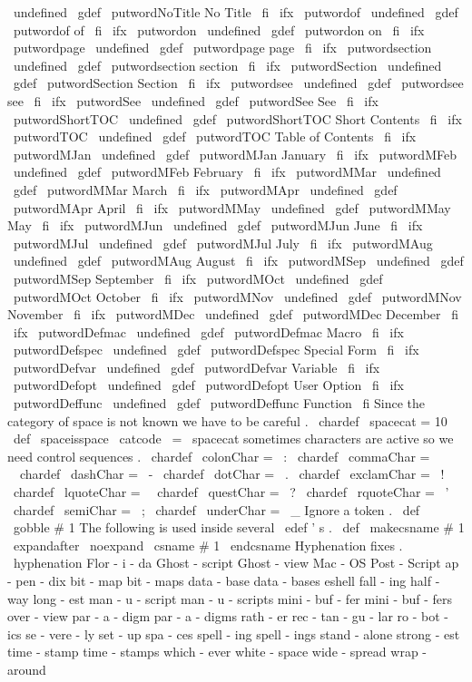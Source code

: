 \
undefined
\
gdef
\
putwordNoTitle
{
No
Title
}
\
fi
\
ifx
\
putwordof
\
undefined
\
gdef
\
putwordof
{
of
}
\
fi
\
ifx
\
putwordon
\
undefined
\
gdef
\
putwordon
{
on
}
\
fi
\
ifx
\
putwordpage
\
undefined
\
gdef
\
putwordpage
{
page
}
\
fi
\
ifx
\
putwordsection
\
undefined
\
gdef
\
putwordsection
{
section
}
\
fi
\
ifx
\
putwordSection
\
undefined
\
gdef
\
putwordSection
{
Section
}
\
fi
\
ifx
\
putwordsee
\
undefined
\
gdef
\
putwordsee
{
see
}
\
fi
\
ifx
\
putwordSee
\
undefined
\
gdef
\
putwordSee
{
See
}
\
fi
\
ifx
\
putwordShortTOC
\
undefined
\
gdef
\
putwordShortTOC
{
Short
Contents
}
\
fi
\
ifx
\
putwordTOC
\
undefined
\
gdef
\
putwordTOC
{
Table
of
Contents
}
\
fi
%
\
ifx
\
putwordMJan
\
undefined
\
gdef
\
putwordMJan
{
January
}
\
fi
\
ifx
\
putwordMFeb
\
undefined
\
gdef
\
putwordMFeb
{
February
}
\
fi
\
ifx
\
putwordMMar
\
undefined
\
gdef
\
putwordMMar
{
March
}
\
fi
\
ifx
\
putwordMApr
\
undefined
\
gdef
\
putwordMApr
{
April
}
\
fi
\
ifx
\
putwordMMay
\
undefined
\
gdef
\
putwordMMay
{
May
}
\
fi
\
ifx
\
putwordMJun
\
undefined
\
gdef
\
putwordMJun
{
June
}
\
fi
\
ifx
\
putwordMJul
\
undefined
\
gdef
\
putwordMJul
{
July
}
\
fi
\
ifx
\
putwordMAug
\
undefined
\
gdef
\
putwordMAug
{
August
}
\
fi
\
ifx
\
putwordMSep
\
undefined
\
gdef
\
putwordMSep
{
September
}
\
fi
\
ifx
\
putwordMOct
\
undefined
\
gdef
\
putwordMOct
{
October
}
\
fi
\
ifx
\
putwordMNov
\
undefined
\
gdef
\
putwordMNov
{
November
}
\
fi
\
ifx
\
putwordMDec
\
undefined
\
gdef
\
putwordMDec
{
December
}
\
fi
%
\
ifx
\
putwordDefmac
\
undefined
\
gdef
\
putwordDefmac
{
Macro
}
\
fi
\
ifx
\
putwordDefspec
\
undefined
\
gdef
\
putwordDefspec
{
Special
Form
}
\
fi
\
ifx
\
putwordDefvar
\
undefined
\
gdef
\
putwordDefvar
{
Variable
}
\
fi
\
ifx
\
putwordDefopt
\
undefined
\
gdef
\
putwordDefopt
{
User
Option
}
\
fi
\
ifx
\
putwordDeffunc
\
undefined
\
gdef
\
putwordDeffunc
{
Function
}
\
fi
%
Since
the
category
of
space
is
not
known
we
have
to
be
careful
.
\
chardef
\
spacecat
=
10
\
def
\
spaceisspace
{
\
catcode
\
=
\
spacecat
}
%
sometimes
characters
are
active
so
we
need
control
sequences
.
\
chardef
\
colonChar
=
\
:
\
chardef
\
commaChar
=
\
\
chardef
\
dashChar
=
\
-
\
chardef
\
dotChar
=
\
.
\
chardef
\
exclamChar
=
\
!
\
chardef
\
lquoteChar
=
\
\
chardef
\
questChar
=
\
?
\
chardef
\
rquoteChar
=
\
'
\
chardef
\
semiChar
=
\
;
\
chardef
\
underChar
=
\
_
%
Ignore
a
token
.
%
\
def
\
gobble
#
1
{
}
%
The
following
is
used
inside
several
\
edef
'
s
.
\
def
\
makecsname
#
1
{
\
expandafter
\
noexpand
\
csname
#
1
\
endcsname
}
%
Hyphenation
fixes
.
\
hyphenation
{
Flor
-
i
-
da
Ghost
-
script
Ghost
-
view
Mac
-
OS
Post
-
Script
ap
-
pen
-
dix
bit
-
map
bit
-
maps
data
-
base
data
-
bases
eshell
fall
-
ing
half
-
way
long
-
est
man
-
u
-
script
man
-
u
-
scripts
mini
-
buf
-
fer
mini
-
buf
-
fers
over
-
view
par
-
a
-
digm
par
-
a
-
digms
rath
-
er
rec
-
tan
-
gu
-
lar
ro
-
bot
-
ics
se
-
vere
-
ly
set
-
up
spa
-
ces
spell
-
ing
spell
-
ings
stand
-
alone
strong
-
est
time
-
stamp
time
-
stamps
which
-
ever
white
-
space
wide
-
spread
wrap
-
around
}
